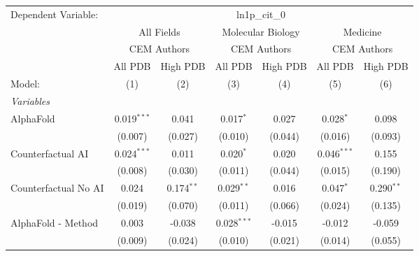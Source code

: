 \begingroup
\centering
\begin{tabular}{lcccccc}
   \tabularnewline \midrule \midrule
   Dependent Variable: & \multicolumn{6}{c}{ln1p\_cit\_0}\\
 & \multicolumn{2}{c}{All Fields} & \multicolumn{2}{c}{Molecular Biology} & \multicolumn{2}{c}{Medicine} \\
\cmidrule(lr){2-3} \cmidrule(lr){4-5} \cmidrule(lr){6-7}
 & \multicolumn{2}{c}{CEM Authors} & \multicolumn{2}{c}{CEM Authors} & \multicolumn{2}{c}{CEM Authors} \\
\cmidrule(lr){2-3} \cmidrule(lr){4-5} \cmidrule(lr){6-7}
 & \multicolumn{1}{c}{All PDB} & \multicolumn{1}{c}{High PDB} & \multicolumn{1}{c}{All PDB} & \multicolumn{1}{c}{High PDB} & \multicolumn{1}{c}{All PDB} & \multicolumn{1}{c}{High PDB} \\
\cmidrule(lr){2-2} \cmidrule(lr){3-3} \cmidrule(lr){4-4} \cmidrule(lr){5-5} \cmidrule(lr){6-6} \cmidrule(lr){7-7}
   Model:                                                     & (1)            & (2)           & (3)            & (4)     & (5)            & (6)\\  
   \midrule
   \emph{Variables}\\
   AlphaFold                                                  & 0.019$^{***}$  & 0.041         & 0.017$^{*}$    & 0.027   & 0.028$^{*}$    & 0.098\\   
                                                              & (0.007)        & (0.027)       & (0.010)        & (0.044) & (0.016)        & (0.093)\\   
   Counterfactual AI                                          & 0.024$^{***}$  & 0.011         & 0.020$^{*}$    & 0.020   & 0.046$^{***}$  & 0.155\\   
                                                              & (0.008)        & (0.030)       & (0.011)        & (0.044) & (0.015)        & (0.190)\\   
   Counterfactual No AI                                       & 0.024          & 0.174$^{**}$  & 0.029$^{**}$   & 0.016   & 0.047$^{*}$    & 0.290$^{**}$\\   
                                                              & (0.019)        & (0.070)       & (0.011)        & (0.066) & (0.024)        & (0.135)\\   
   AlphaFold - Method                                         & 0.003          & -0.038        & 0.028$^{***}$  & -0.015  & -0.012         & -0.059\\   
                                                              & (0.009)        & (0.024)       & (0.010)        & (0.021) & (0.014)        & (0.055)\\   

\end{tabular}
